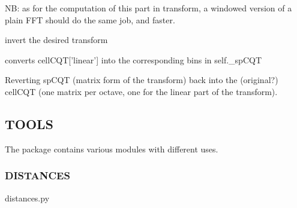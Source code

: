 \documentclass[letterpaper,10pt,english]{sphinxmanual}
\begin{document}
\begin{fulllineitems}
\begin{fulllineitems}
NB: as for the computation of this part in transform, a windowed
version
of a plain FFT should do the same job, and faster.

\end{fulllineitems}


\begin{fulllineitems}
\label{reference/tftransforms:pyfasst.tftransforms.minqt.MinQTransfo.invertTransform}
invert the desired transform

\end{fulllineitems}


\begin{fulllineitems}
\label{reference/tftransforms:pyfasst.tftransforms.minqt.MinQTransfo.linCellCQT2LinSpCQT}
converts cellCQT{[}'linear'{]} into the corresponding bins in
self.\_spCQT

\end{fulllineitems}


\begin{fulllineitems}
\label{reference/tftransforms:pyfasst.tftransforms.minqt.MinQTransfo.spCQT2CellCQT}
Reverting spCQT (matrix form of the transform) back into
the (original?) cellCQT (one matrix per octave, one for the linear
part of the transform).

\end{fulllineitems}


\end{fulllineitems}



\subsection{TOOLS}
\label{reference/tools:tools}\label{reference/tools::doc}
The  package contains various modules with different uses.


\subsubsection{DISTANCES}
\label{reference/tools:distances}\label{reference/tools:module-pyfasst.tools.distances}
distances.py
\end{document}
